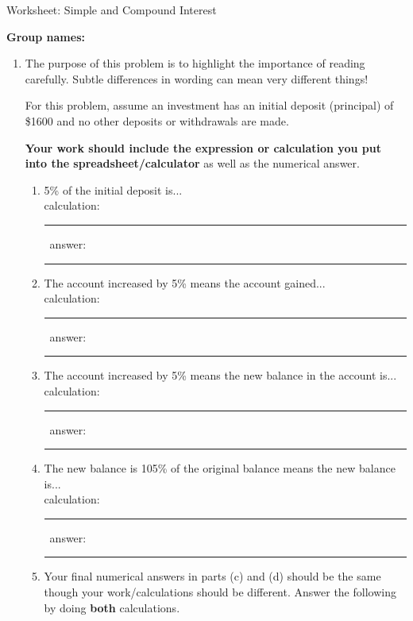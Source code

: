 \documentclass[12pt]{article}
\renewcommand{\emph}[1]{\textsf{\textbf{#1}}}
\newcommand{\ans}[1][1in]{\rule{#1}{.5pt}}
\begin{document}
\begin{center}
{\Large  Worksheet: Simple and Compound Interest}
\end{center}



\noindent \textbf{Group names:} \hrulefill \\


\begin{enumerate}
\item The purpose of this problem is to highlight the importance of reading carefully. Subtle differences in wording can mean very different things!

For this problem, assume an investment has an initial deposit (principal) of \$1600 and no other deposits or withdrawals are made. 

\textbf{Your work should include the expression or calculation you put into the spreadsheet/calculator} as well as the numerical answer.

	\begin{enumerate}
	\item 5\% of the initial deposit is... \\
	
	calculation: \ans[2in] \ answer: \ans
	
	\item The account increased by 5\% means the account gained...\\
	
	calculation: \ans[2in]\  answer: \ans

	
	\item The account increased by 5\% means the new balance in the account is... \\
	
calculation: \ans[2in] \ answer: \ans

	
	
	\item The new balance is 105\% of the original balance means the new balance is... \\
	
calculation: \ans[2in]\ answer: \ans

	
	
	\item Your final numerical answers in parts (c) and (d) should be the same though your work/calculations should be different. Answer the following by doing \emph{both }calculations.\\
	

\end{enumerate}
\end{enumerate}
\end{document}
